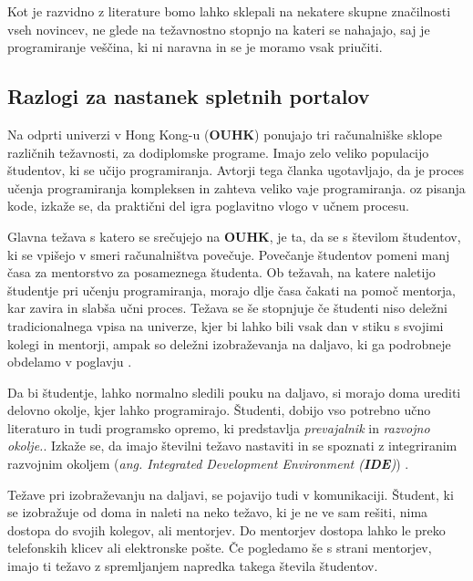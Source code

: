 Kot je razvidno z literature bomo lahko sklepali na nekatere skupne
značilnosti vseh novincev, ne glede na težavnostno stopnjo na kateri
se nahajajo, saj je programiranje veščina, ki ni naravna in se je
moramo vsak priučiti.




\subsection{Razlogi za nastanek spletnih portalov}
\label{sec:razlogi_za_nastanek_SPUP}

Na odprti univerzi v Hong Kong-u (\textbf{OUHK}) ponujajo tri
računalniške sklope različnih težavnosti, za dodiplomske
programe. Imajo zelo veliko populacijo študentov, ki se učijo
programiranja. Avtorji tega članka \cite{ITaLCP_DistanceEdu}
ugotavljajo, da je proces učenja programiranja kompleksen in zahteva
veliko vaje programiranja. oz pisanja kode, izkaže se, da praktični
del igra poglavitno vlogo v učnem procesu.

Glavna težava s katero se srečujejo na \textbf{OUHK}, je ta, da se s
številom študentov, ki se vpišejo v smeri računalništva
povečuje. Povečanje študentov pomeni manj časa za mentorstvo za
posameznega študenta. Ob težavah, na katere naletijo študentje pri
učenju programiranja, morajo dlje časa čakati na pomoč mentorja, kar
zavira in slabša učni proces. Težava se še stopnjuje če študenti niso
deležni tradicionalnega vpisa na univerze, kjer bi lahko bili vsak dan
v stiku s svojimi kolegi in mentorji, ampak so deležni izobraževanja
na daljavo, ki ga podrobneje obdelamo v poglavju
\pageref{sec:Učenje_na_daljavo}.

Da bi študentje, lahko normalno sledili pouku na daljavo, si morajo
doma urediti delovno okolje, kjer lahko programirajo. Študenti,
dobijo vso potrebno učno literaturo in tudi programsko opremo, ki
predstavlja \emph{prevajalnik} in \emph{razvojno okolje.}. Izkaže se,
da imajo številni težavo nastaviti in se spoznati z integriranim
razvojnim okoljem (\emph{ang. Integrated Development Environment
  (\textbf{IDE})}) \cite{ITaLCP_DistanceEdu}.

Težave pri izobraževanju na daljavi, se pojavijo tudi v
komunikaciji. Študent, ki se izobražuje od doma in naleti na neko
težavo, ki je ne ve sam rešiti, nima dostopa do svojih kolegov, ali
mentorjev. Do mentorjev dostopa lahko le preko telefonskih klicev ali
elektronske pošte. Če pogledamo še s strani mentorjev, imajo ti težavo
z spremljanjem napredka takega števila študentov.


